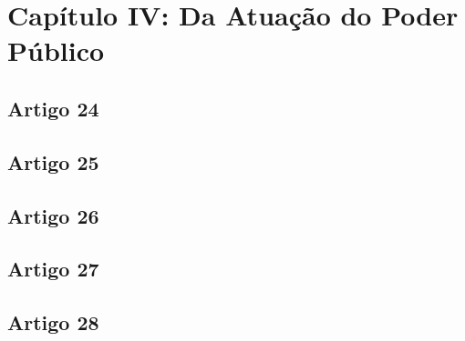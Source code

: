 \section{Capítulo IV: Da Atuação do Poder Público}

\subsection{Artigo 24}


\subsection{Artigo 25}


\subsection{Artigo 26}


\subsection{Artigo 27}


\subsection{Artigo 28}

